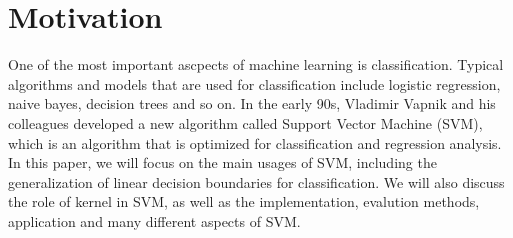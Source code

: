 \section{Motivation}
One of the most important ascpects of machine learning is classification. Typical algorithms and models
that are used for classification include logistic regression, naive bayes, decision trees and so on. In the early 90s, 
Vladimir Vapnik and his colleagues developed a new algorithm called Support Vector Machine (SVM), which is an algorithm 
that is optimized for classification and regression analysis. In this paper,
we will focus on the main usages of SVM, including the generalization of linear decision boundaries for classification.
We will also discuss the role of kernel in SVM, as well as the implementation, evalution methods, application and many
different aspects of SVM.
